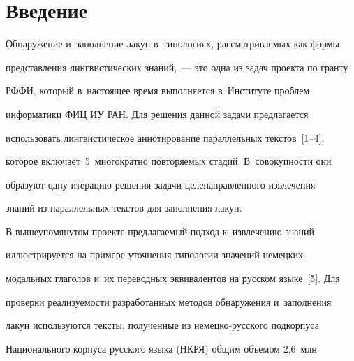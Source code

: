 







      \thispagestyle{headings}


      


      \vspace*{-18pt} 





\section{Введение}





\vspace*{-2pt}





  Обнаружение и~заполнение лакун в~типологиях, рассматриваемых как формы 


представления лингвистических знаний,~--- это одна из задач проекта по гранту 


РФФИ, который в~настоящее время выполняется в~Институте проблем 


информатики ФИЦ ИУ РАН. Для решения данной задачи предлагается 


использовать лингвистическое аннотирование параллельных текстов~[1--4], 


которое вклю\-ча\-ет~5~мно\-го\-крат\-но повторяемых стадий. В~совокупности они 


образуют одну итерацию решения задачи целенаправленного извлечения 


знаний из параллельных текстов для заполнения лакун.


  


  В вышеупомянутом проекте предлагаемый подход к~извлечению знаний 


иллюстрируется на примере уточнения типологии значений немецких 


модальных глаголов и~их переводных эквивалентов на русском языке~[5]. Для 


проверки реализуемости разработанных методов обнаружения и~заполнения 


лакун используются тексты, полученные из не\-мец\-ко-рус\-ско\-го подкорпуса 


Национального корпуса русского языка (НКРЯ) общим объемом 2,6~млн 


